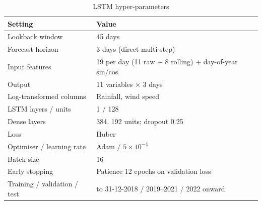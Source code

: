 \begin{table}[H]
	\centering
	\caption{LSTM hyper-parameters}
	\small
	\begin{tabular}{ll}
		\toprule
		\textbf{Setting} & \textbf{Value} \\
		\midrule
		Lookback window & 45 days \\
		Forecast horizon & 3 days (direct multi-step) \\
		Input features & 19 per day (11 raw + 8 rolling) + day-of-year sin/cos \\
		Output & 11 variables $\times$ 3 days \\
		Log-transformed columns & Rainfall, wind speed \\
		LSTM layers / units & 1 / 128 \\
		Dense layers & 384, 192 units; dropout 0.25 \\
		Loss & Huber \\
		Optimiser / learning rate & Adam / $5\times 10^{-4}$ \\
		Batch size & 16 \\
		Early stopping & Patience 12 epochs on validation loss \\
		Training / validation / test & to 31-12-2018 / 2019--2021 / 2022 onward \\
		\bottomrule
	\end{tabular}
\end{table}

